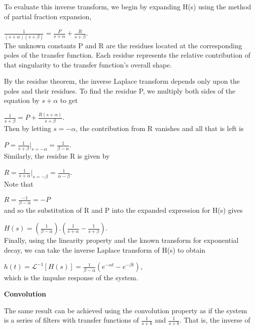 \documentclass[12pt]{article}
\begin{document}
{To evaluate this inverse transform, we begin by expanding H(s) using the method of partial fraction expansion,


$\frac{1}{(s + \alpha)(s + \beta)} = \frac{P}{s + \alpha} + \frac{R}{s + \beta}$.\\

The unknown constants P and R are the residues located at the corresponding poles of the transfer function. Each residue represents the relative contribution of that singularity to the transfer function's overall shape.

By the residue theorem, the inverse Laplace transform depends only upon the poles and their residues. To find the residue P, we multiply both sides of the equation by $s + \alpha$ to get


$\frac{1}{s + \beta} = P + \frac{R(s + \alpha)}{s + \beta}$.\\

Then by letting $s =-\alpha$, the contribution from R vanishes and all that is left is 

$P = \frac{1}{s + \beta}|_{s=-\alpha} = \frac{1}{\beta - \alpha}$.\\

Similarly, the residue R is given by


$R = \frac{1}{s + \alpha}|_{s=-\beta} = \frac{1}{\alpha - \beta}$.\\

Note that 

$R = \frac{-1}{\beta - \alpha} = -P$\\

and so the substitution of R and P into the expanded expression for H(s) gives

$H(s) = (\frac{1}{\beta - \alpha}) . (\frac{1}{s + \alpha} - \frac{1}{s + \beta})$.\\

Finally, using the linearity property and the known transform for exponential decay, we can take the inverse Laplace transform of H(s) to obtain


$h(t)=\mathcal {L}^{-1}[H(s)] = \frac{1}{\beta - \alpha} (e^{-\alpha t} - e^{-\beta t})$,\\

which is the impulse response of the system.


\textbf{Convolution}


The same result can be achieved using the convolution property as if the system is a series of filters with transfer functions of $\frac{1}{s + b}$ and $\frac{1}{s + b}$. That is, the inverse of


}
\end{document}
